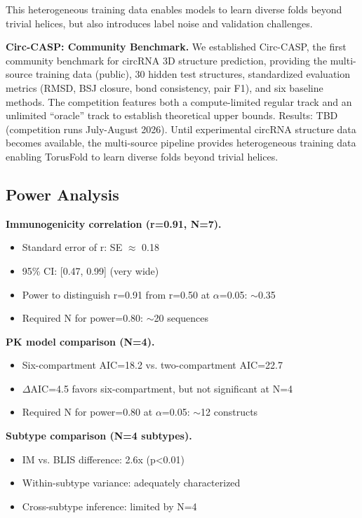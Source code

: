 \documentclass[12pt]{article}
\begin{document}
This heterogeneous training data enables models to learn diverse folds beyond trivial helices, but also introduces label noise and validation challenges.

\textbf{Circ-CASP: Community Benchmark.} We established Circ-CASP, the first community benchmark for circRNA 3D structure prediction, providing the multi-source training data (public), 30 hidden test structures, standardized evaluation metrics (RMSD, BSJ closure, bond consistency, pair F1), and six baseline methods. The competition features both a compute-limited regular track and an unlimited ``oracle'' track to establish theoretical upper bounds. Results: TBD (competition runs July-August 2026). Until experimental circRNA structure data becomes available, the multi-source pipeline provides heterogeneous training data enabling TorusFold to learn diverse folds beyond trivial helices.

\subsection{Power Analysis}

\textbf{Immunogenicity correlation (r=0.91, N=7).}
\begin{itemize}
\item Standard error of r: SE $\approx$ 0.18
\item 95\% CI: [0.47, 0.99] (very wide)
\item Power to distinguish r=0.91 from r=0.50 at $\alpha$=0.05: $\sim$0.35
\item Required N for power=0.80: $\sim$20 sequences
\end{itemize}

\textbf{PK model comparison (N=4).}
\begin{itemize}
\item Six-compartment AIC=18.2 vs. two-compartment AIC=22.7
\item $\Delta$AIC=4.5 favors six-compartment, but not significant at N=4
\item Required N for power=0.80 at $\alpha$=0.05: $\sim$12 constructs
\end{itemize}

\textbf{Subtype comparison (N=4 subtypes).}
\begin{itemize}
\item IM vs. BLIS difference: 2.6x (p<0.01)
\item Within-subtype variance: adequately characterized
\item Cross-subtype inference: limited by N=4
\end{itemize}
\end{document}

